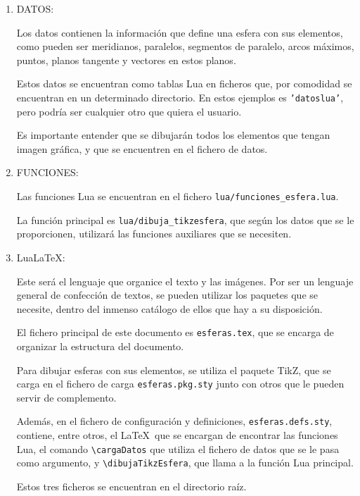 \begin{enumerate}
\item DATOS:

  Los datos contienen la información que define una esfera con sus elementos,
  como pueden ser meridianos, paralelos, segmentos de paralelo, arcos máximos, puntos,
  planos tangente y vectores en estos planos.
  
  Estos datos se encuentran como tablas \textsf{Lua}  en ficheros que, por comodidad se
  encuentran en un determinado directorio. En estos ejemplos es \texttt{'datoslua'}, pero
  podría ser cualquier otro que quiera el usuario.

  Es importante entender que se dibujarán todos los elementos que tengan imagen gráfica,
  y que se encuentren en el fichero de datos.
  
\item FUNCIONES:

  Las funciones Lua se encuentran en el fichero
  \texttt{lua/funciones\_esfera.lua}.
  
  La función principal es \texttt{lua/dibuja\_tikzesfera}, que según los datos
  que se le proporcionen, utilizará las funciones auxiliares que se necesiten.

\item Lua\LaTeX :

  Este será el lenguaje que organice el texto y las imágenes.
  Por ser un lenguaje general de confección de textos, se pueden utilizar los paquetes
  que se necesite, dentro del inmenso catálogo de ellos que hay a su disposición.

  El fichero principal de este documento es \texttt{esferas.tex}, que se encarga de
  organizar la estructura del documento.
  
  Para dibujar esferas con sus elementos, se utiliza el paquete \textsf{TikZ}, que se
  carga en el fichero de carga \texttt{esferas.pkg.sty} junto con otros que le pueden
  servir de complemento.

  Además, en el fichero de configuración y definiciones, \texttt{esferas.defs.sty},
  contiene, entre otros, el \LaTeX\ que se encargan de encontrar las funciones
  \textsf{Lua}, el comando \texttt{\textbackslash cargaDatos} que utiliza el fichero de
  datos que se le pasa como argumento, y \texttt{\textbackslash dibujaTikzEsfera}, que
  llama a la función \textsf{Lua} principal.

  Estos tres ficheros se encuentran en el directorio raíz.
\end{enumerate}

